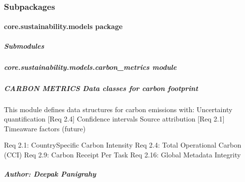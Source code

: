 \documentclass[letterpaper,10pt,english]{sphinxmanual}
\begin{document}
\subsubsection{Subpackages}
\label{\detokenize{core.sustainability:subpackages}}
\sphinxstepscope


\paragraph{core.sustainability.models package}
\label{\detokenize{core.sustainability.models:core-sustainability-models-package}}\label{\detokenize{core.sustainability.models::doc}}

\subparagraph{Submodules}
\label{\detokenize{core.sustainability.models:submodules}}
\sphinxstepscope


\subparagraph{core.sustainability.models.carbon\_metrics module}
\label{\detokenize{core.sustainability.models.carbon_metrics:module-core.sustainability.models.carbon_metrics}}\label{\detokenize{core.sustainability.models.carbon_metrics:core-sustainability-models-carbon-metrics-module}}\label{\detokenize{core.sustainability.models.carbon_metrics::doc}}

\subparagraph{CARBON METRICS \textendash{} Data classes for carbon footprint}
\label{\detokenize{core.sustainability.models.carbon_metrics:carbon-metrics-data-classes-for-carbon-footprint}}
\sphinxAtStartPar
This module defines data structures for carbon emissions with:
\sphinxhyphen{} Uncertainty quantification {[}Req 2.4{]}
\sphinxhyphen{} Confidence intervals
\sphinxhyphen{} Source attribution {[}Req 2.1{]}
\sphinxhyphen{} Time\sphinxhyphen{}aware factors (future)
\begin{description}
\sphinxAtStartPar
Req 2.1: Country\sphinxhyphen{}Specific Carbon Intensity
Req 2.4: Total Operational Carbon (CCI)
Req 2.9: Carbon Receipt Per Task
Req 2.16: Global Metadata Integrity

\end{description}


\subparagraph{Author: Deepak Panigrahy}
\label{\detokenize{core.sustainability.models.carbon_metrics:author-deepak-panigrahy}}
\end{document}
